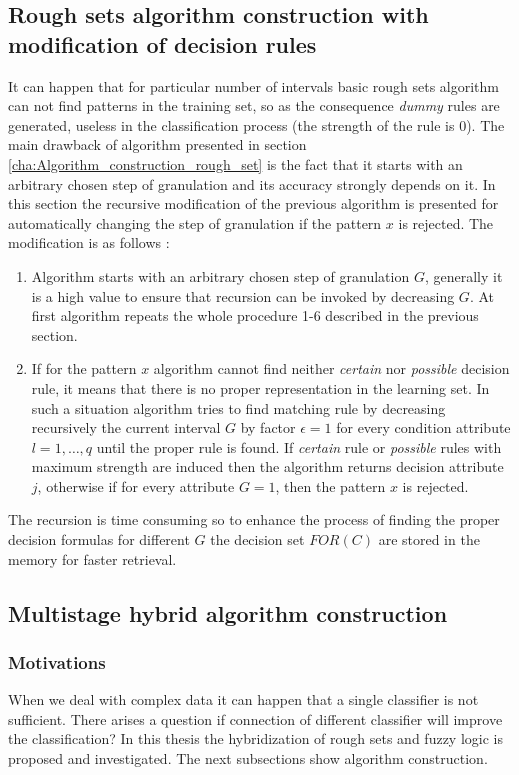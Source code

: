 \subsection{Rough sets algorithm construction with modification of decision rules}
\label{cha:Algorithm_construction_rough_set_modification}
It can happen that for particular number of intervals basic rough sets algorithm can not find patterns in
the training set, so as the consequence \textit{dummy} rules are generated, useless in the
classification process (the strength of the rule is 0). 
The main drawback of algorithm presented in section \ref{cha:Algorithm_construction_rough_set}
is the fact that it starts with an arbitrary chosen step of granulation and its accuracy strongly
depends on it. In this section the recursive modification of the previous algorithm is
presented for automatically changing the step of granulation if
the pattern $x$ is rejected. The modification is as follows \cite{bib36}:
\begin{enumerate}
    \item Algorithm starts with an arbitrary chosen step of granulation  $G$, 
        generally it is a high value to ensure that recursion can be invoked
        by decreasing $G$. At first algorithm repeats the whole procedure 1-6 described
        in the previous section.
    \item If for the pattern $x$ algorithm cannot find neither \textit{certain} nor \textit{possible}
        decision rule, it means that there is no proper representation in the learning set. 
        In such a situation algorithm tries to find matching rule by decreasing recursively
        the current interval $G$ by factor $\epsilon=1$ for every condition attribute $l=1, \ldots, q$
        until the proper rule is found. If \textit{certain} rule or
        \textit{possible} rules with maximum strength are induced then the algorithm
        returns decision attribute $j$, otherwise if for every attribute $G=1$, then the pattern $x$ is rejected.
\end{enumerate} 
The recursion is time consuming so to enhance the process of finding the proper
decision formulas for different $G$ the decision set $FOR(C)$ are stored in the memory
for faster retrieval.

\subsection{Multistage hybrid algorithm construction}
\label{cha:Multistage}
\subsubsection{Motivations}
\label{cha:Mutlistage_motivations}
When we deal with complex data it can happen that a single classifier is not
sufficient. There arises a question if connection of different classifier will
improve the classification? In this thesis the hybridization of rough sets and
fuzzy logic is proposed and investigated. The next subsections show algorithm construction.

